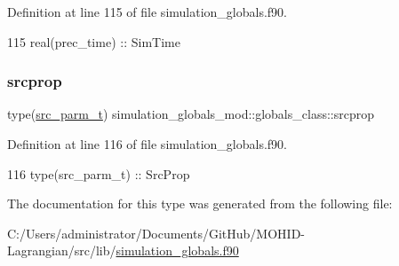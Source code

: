 Definition at line 115 of file simulation\+\_\+globals.\+f90.


\begin{DoxyCode}
115         \textcolor{keywordtype}{real(prec\_time)}     :: SimTime
\end{DoxyCode}
\mbox{\label{structsimulation__globals__mod_1_1globals__class_a39d1ca59bae468f4893a5391d20b6937}} 
\subsubsection{\texorpdfstring{srcprop}{srcprop}}
{\footnotesize\ttfamily type(\mbox{\hyperlink{structsimulation__globals__mod_1_1src__parm__t}{src\+\_\+parm\+\_\+t}}) simulation\+\_\+globals\+\_\+mod\+::globals\+\_\+class\+::srcprop\hspace{0.3cm}{\ttfamily [private]}}



Definition at line 116 of file simulation\+\_\+globals.\+f90.


\begin{DoxyCode}
116         \textcolor{keywordtype}{type}(src\_parm\_t)    :: SrcProp
\end{DoxyCode}


The documentation for this type was generated from the following file\+:\begin{DoxyCompactItemize}
\item 
C\+:/\+Users/administrator/\+Documents/\+Git\+Hub/\+M\+O\+H\+I\+D-\/\+Lagrangian/src/lib/\mbox{\hyperlink{simulation__globals_8f90}{simulation\+\_\+globals.\+f90}}\end{DoxyCompactItemize}
